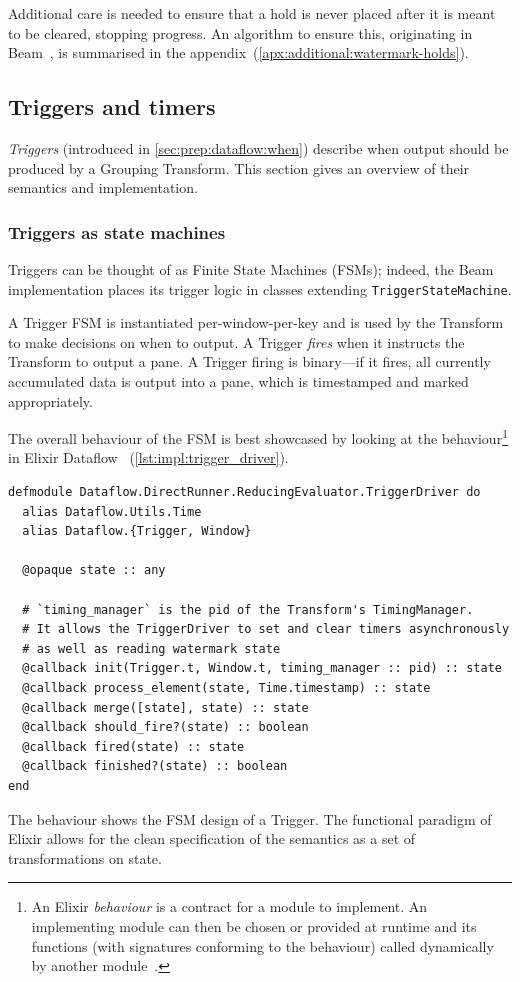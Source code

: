 Additional care is needed to ensure that a hold is never placed after it is meant to be cleared, stopping progress.
An algorithm to ensure this, originating in Beam~\cite{BEAM-code-WatermarkManager}, is summarised in the appendix~(\cref{apx:additional:watermark-holds}).

\subsection{Triggers and timers}\label{sec:impl:dataflow:triggers-timers}

\emph{Triggers} (introduced in \cref{sec:prep:dataflow:when}) describe when output should be produced by a Grouping Transform.
This section gives an overview of their semantics and implementation.

\subsubsection{Triggers as state machines}
Triggers can be thought of as Finite State Machines (FSMs); indeed, the Beam implementation places its trigger logic in classes extending \verb|TriggerStateMachine|.

A Trigger FSM is instantiated per-window-per-key and is used by the Transform to make decisions on when to output.
A Trigger \emph{fires} when it instructs the Transform to output a pane.
A Trigger firing is binary---if it fires, all currently accumulated data is output into a pane, which is timestamped and marked appropriately.

The overall behaviour of the FSM is best showcased by looking at the  behaviour\footnote{An Elixir \emph{behaviour} is a contract for a module to implement. An implementing module can then be chosen or provided at runtime and its functions (with signatures conforming to the behaviour) called dynamically by another module~\cite[281]{Thomas:2016}.} in Elixir Dataflow ~(\cref{lst:impl:trigger_driver}).

\begin{listing}[h]
	\begin{verbatim}
defmodule Dataflow.DirectRunner.ReducingEvaluator.TriggerDriver do
  alias Dataflow.Utils.Time
  alias Dataflow.{Trigger, Window}
  
  @opaque state :: any
  
  # `timing_manager` is the pid of the Transform's TimingManager.
  # It allows the TriggerDriver to set and clear timers asynchronously
  # as well as reading watermark state
  @callback init(Trigger.t, Window.t, timing_manager :: pid) :: state
  @callback process_element(state, Time.timestamp) :: state
  @callback merge([state], state) :: state
  @callback should_fire?(state) :: boolean
  @callback fired(state) :: state
  @callback finished?(state) :: boolean
end
	\end{verbatim}
\caption[The  behaviour showing the Finite State Machine design of a Trigger.]{The  behaviour shows the FSM design of a Trigger. The functional paradigm of Elixir allows for the clean specification of the semantics as a set of transformations on state.}
\label{lst:impl:trigger_driver}
\end{listing}

